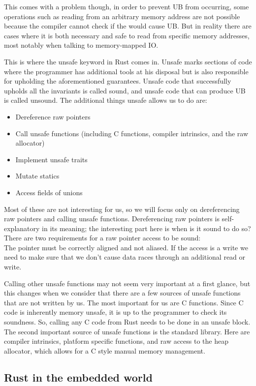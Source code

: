 This comes with a problem though, in order to prevent UB from occurring,
some operations such as reading from an arbitrary memory address are not possible
because the compiler cannot check if the would cause UB.
But in reality there are cases where it is both necessary and safe to read from specific memory addresses,
most notably when talking to memory-mapped IO.

This is where the unsafe keyword in Rust comes in.
Unsafe marks sections of code where the programmer has additional tools at his disposal but is also responsible for upholding the aforementioned guarantees.
Unsafe code that successfully upholds all the invariants is called sound, and unsafe code that can produce UB is called unsound.
The additional things unsafe allows us to do are:
\begin{itemize}
    \item Dereference raw pointers
    \item Call unsafe functions (including C functions, compiler intrinsics, and the raw allocator)
    \item Implement unsafe traits
    \item Mutate statics
    \item Access fields of unions
\end{itemize}

Most of these are not interesting for us, so we will focus only on dereferencing raw pointers and calling unsafe functions.
Dereferencing raw pointers is self-explanatory in its meaning; the interesting part here is when is it sound to do so?
There are two requirements for a raw pointer access to be sound:\\
The pointer must be correctly aligned and not aliased.
If the access is a write we need to make sure that we don't cause data races through an additional read or write.

Calling other unsafe functions may not seem very important at a first glance,
but this changes when we consider that there are a few sources of unsafe functions that are not written by us.
The most important for us are C functions.
Since C code is inherently memory unsafe, it is up to the programmer to check its soundness.
So, calling any C code from Rust needs to be done in an unsafe block.
The second important source of unsafe functions is the standard library.
Here are compiler intrinsics, platform specific functions, and raw access to the heap allocator, which allows for a C style manual memory management.

\subsection{Rust in the embedded world}
\label{sec:background:rust:embedded}

